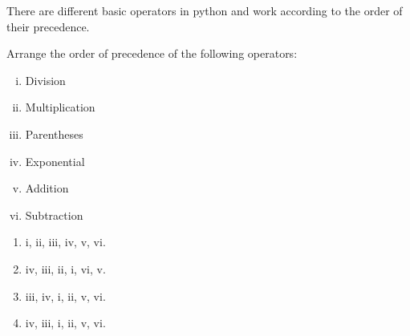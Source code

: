 \question
There are different basic operators in python and work according to the order of their precedence.

Arrange the order of precedence of the following operators:

\begin{enumerate}[i)]
\item Division
\item Multiplication
\item Parentheses
\item Exponential
\item Addition
\item Subtraction
\end{enumerate}

\begin{enumerate}
\item i, ii, iii, iv, v, vi.
\item iv, iii, ii, i, vi, v.
\item iii, iv, i, ii, v, vi.
\item iv, iii, i, ii, v, vi.
\end{enumerate}

